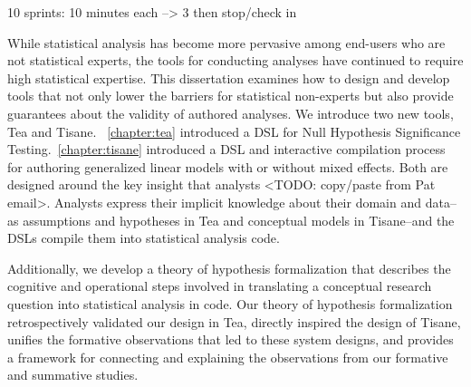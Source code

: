 10 sprints: 10 minutes each --> 3 then stop/check in

While statistical analysis has become more pervasive among end-users who are not
statistical experts, the tools for conducting analyses have continued to require
high statistical expertise. This dissertation examines how to design and develop
tools that not only lower the barriers for statistical non-experts but also
provide guarantees about the validity of authored analyses. We introduce two new
tools, Tea and Tisane. ~\autoref{chapter:tea} introduced a DSL for Null
Hypothesis Significance Testing.~\autoref{chapter:tisane} introduced a DSL and
interactive compilation process for authoring generalized linear models with or
without mixed effects. Both are designed around the key insight that analysts
<TODO: copy/paste from Pat email>. Analysts express their implicit knowledge
about their domain and data--as assumptions and hypotheses in Tea and conceptual
models in Tisane--and the DSLs compile them into statistical analysis code. 

Additionally, we develop a theory of hypothesis formalization that describes the
cognitive and operational steps involved in translating a conceptual research
question into statistical analysis in code. Our theory of hypothesis
formalization retrospectively validated our design in Tea, directly inspired the
design of Tisane, unifies the formative observations that led to these system
designs, and provides a framework for connecting and explaining the observations
from our formative and summative studies. 

